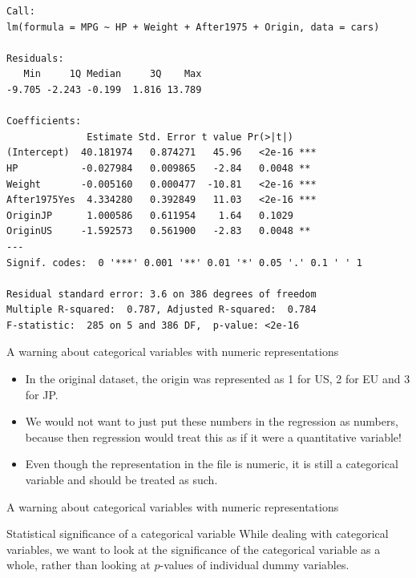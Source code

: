 \documentclass{beamer}\usepackage[]{graphicx}\usepackage[]{color}
\makeatletter
\newenvironment{kframe}{%
 \def\at@end@of@kframe{}%
 \ifinner\ifhmode%
  \def\at@end@of@kframe{\end{minipage}}%
  \begin{minipage}{\columnwidth}%
 \fi\fi%
 \def\FrameCommand##1{\hskip\@totalleftmargin \hskip-\fboxsep
 \colorbox{shadecolor}{##1}\hskip-\fboxsep
     \hskip-\linewidth \hskip-\@totalleftmargin \hskip\columnwidth}%
 \MakeFramed {\advance\hsize-\width
   \@totalleftmargin\z@ \linewidth\hsize
   \@setminipage}}%
 {\par\unskip\endMakeFramed%
 \at@end@of@kframe}
\newenvironment{knitrout}{}{} %
\makeatother
\begin{document}
\begin{darkframes}
\begin{frame}[fragile]
\begin{knitrout}
\begin{kframe}
\begin{verbatim}
Call:
lm(formula = MPG ~ HP + Weight + After1975 + Origin, data = cars)

Residuals:
   Min     1Q Median     3Q    Max 
-9.705 -2.243 -0.199  1.816 13.789 

Coefficients:
              Estimate Std. Error t value Pr(>|t|)    
(Intercept)  40.181974   0.874271   45.96   <2e-16 ***
HP           -0.027984   0.009865   -2.84   0.0048 ** 
Weight       -0.005160   0.000477  -10.81   <2e-16 ***
After1975Yes  4.334280   0.392849   11.03   <2e-16 ***
OriginJP      1.000586   0.611954    1.64   0.1029    
OriginUS     -1.592573   0.561900   -2.83   0.0048 ** 
---
Signif. codes:  0 '***' 0.001 '**' 0.01 '*' 0.05 '.' 0.1 ' ' 1

Residual standard error: 3.6 on 386 degrees of freedom
Multiple R-squared:  0.787,	Adjusted R-squared:  0.784 
F-statistic:  285 on 5 and 386 DF,  p-value: <2e-16
\end{verbatim}
\end{kframe}
\end{knitrout}
    \end{frame}

    \begin{frame}[fragile]{A warning about categorical variables with numeric representations}
      \begin{itemize}[<+->]
        \item In the original dataset, the origin was represented as 1 for US, 2 for EU and 3 for JP.
        \item We would \alert{not} want to just put these numbers in the regression as numbers, because then regression would treat this as if it were a quantitative variable!
        \item Even though the representation in the file is numeric, it is still a categorical variable and should be treated as such.
      \end{itemize}
    \end{frame}

    \begin{frame}[fragile]{A warning about categorical variables with numeric representations}
\begin{knitrout}


\end{knitrout}
    \end{frame}

    \begin{frame}[fragile]{Statistical significance of a categorical variable}
      While dealing with categorical variables, we want to look at the significance of the categorical variable as a whole, rather than looking at $p$-values of individual dummy variables.


\end{frame}
\end{darkframes}
\end{document}
